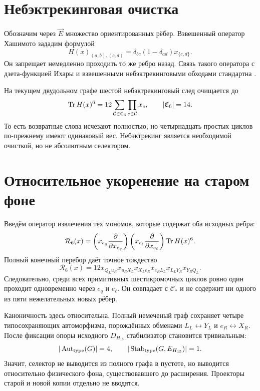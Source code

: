 \section{Небэктрекинговая очистка}

Обозначим через $\vec E$ множество ориентированных рёбер. Взвешенный
оператор Хашимото зададим формулой
\begin{equation}
 H(x)_{(a,b),(c,d)}
 =\delta_{bc}(1-\delta_{ad})x_{\{c,d\}}.
 \label{eq:v7-rooted-cycle-hashimoto}
\end{equation}
Он запрещает немедленно проходить то же ребро назад. Связь такого оператора
с дзета-функцией Ихары и взвешенными небэктрекинговыми обходами стандартна
\cite{v7-rooted-cycle-hashimoto-source,v7-rooted-cycle-weighted-ihara}.

На текущем двудольном графе шестой небэктрекинговый след очищается до
\begin{equation}
 \operatorname{Tr} H(x)^6=12\sum_{\mathcal C\in\mathfrak C_6}
 \prod_{e\in\mathcal C}x_e,
 \qquad |\mathfrak C_6|=14.
 \label{eq:v7-rooted-cycle-nonbacktracking-trace}
\end{equation}
То есть возвратные слова исчезают полностью, но четырнадцать простых циклов
по-прежнему имеют одинаковый вес. Небэктрекинг является необходимой
очисткой, но не абсолютным селектором.

\section{Относительное укоренение на старом фоне}

Введём оператор извлечения тех мономов, которые содержат оба исходных ребра:
\begin{equation}
 \mathcal R_6(x)
 =\left(x_{e_q}\frac{\partial}{\partial x_{e_q}}\right)
  \left(x_{e_\ell}\frac{\partial}{\partial x_{e_\ell}}\right)
  \operatorname{Tr} H(x)^6.
 \label{eq:v7-rooted-cycle-response}
\end{equation}
Полный конечный перебор даёт точное тождество
\begin{equation}
 \mathcal R_6(x)
 =12x_{Q_Lu_R}x_{u_RX_L}x_{X_Le_R}
 x_{e_RL_L}x_{L_LY_R}x_{Y_RQ_L}.
 \label{eq:v7-rooted-cycle-unique-word}
\end{equation}
Следовательно, среди всех примитивных шестикромочных циклов ровно один
проходит одновременно через $e_q$ и $e_\ell$. Он совпадает с
$\mathcal C_*$ и не содержит ни одного из пяти нежелательных новых рёбер.

Каноничность здесь относительна. Полный немеченый граф сохраняет четыре
типосохраняющих автоморфизма, порождённых обменами
$L_L\leftrightarrow Y_L$ и $e_R\leftrightarrow X_R$. После фиксации
опоры исходного $D_{H_{15}}$ стабилизатор становится тривиальным:
\begin{equation}
 |\operatorname{Aut}_{\rm type}(G)|=4,
 \qquad
 |\operatorname{Stab}_{\rm type}(G,E_{H_{15}})|=1.
 \label{eq:v7-rooted-cycle-automorphisms}
\end{equation}
Значит, селектор не выводится из полного графа в пустоте, но выводится
относительно физического фона, существовавшего до расширения. Проекторы
старой и новой копии отдельно не вводятся.

